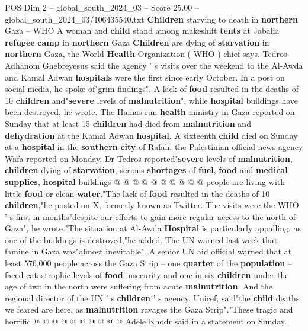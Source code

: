 \begin{textsample}{POS Dim 2 – global\_south\_2024\_03 – Score 25.00 – global\_south\_2024\_03/106435540.txt}  \label{ex:f2_pos_017}
\textbf{Children} starving to death in \textbf{northern} Gaza -- WHO A woman and \textbf{child} stand among makeshift \textbf{tents} at Jabalia \textbf{refugee} \textbf{camp} in \textbf{northern} Gaza \textbf{Children} are dying of \textbf{starvation} in \textbf{northern} Gaza, the World \textbf{Health} Organization ( WHO ) chief says.
Tedros Adhanom Ghebreyesus said the agency ' s visits over the weekend to the Al-Awda and Kamal Adwan \textbf{hospitals} were the first since early October.
In a post on social media, he spoke of"grim findings".
A lack of \textbf{food} resulted in the deaths of 10 \textbf{children} and"\textbf{severe} levels of \textbf{malnutrition}", while \textbf{hospital} buildings have been destroyed, he wrote.
The Hamas-run \textbf{health} ministry in Gaza reported on Sunday that at least 15 \textbf{children} had died from \textbf{malnutrition} and \textbf{dehydration} at the Kamal Adwan \textbf{hospital}.
A sixteenth \textbf{child} died on Sunday at a \textbf{hospital} in the \textbf{southern} \textbf{city} of Rafah, the Palestinian official news agency Wafa reported on Monday.
Dr Tedros reported"\textbf{severe} levels of \textbf{malnutrition}, \textbf{children} dying of \textbf{starvation}, serious \textbf{shortages} of \textbf{fuel}, \textbf{food} and \textbf{medical} \textbf{supplies}, \textbf{hospital} buildings @ @ @ @ @ @ @ @ @ @ people are living with little \textbf{food} or clean \textbf{water}."The lack of \textbf{food} resulted in the deaths of 10 \textbf{children},"he posted on X, formerly known as Twitter.
The visits were the WHO ' s first in months"despite our efforts to gain more regular access to the north of Gaza", he wrote."The situation at Al-Awda \textbf{Hospital} is particularly appalling, as one of the buildings is destroyed,"he added.
The UN warned last week that famine in Gaza was"almost inevitable".
A senior UN aid official warned that at least 576,000 people across the Gaza Strip -- one \textbf{quarter} of the \textbf{population} -- faced catastrophic levels of \textbf{food} insecurity and one in six \textbf{children} under the age of two in the north were suffering from acute \textbf{malnutrition}.
And the regional director of the UN ' s \textbf{children} ' s agency, Unicef, said"the \textbf{child} deaths we feared are here, as \textbf{malnutrition} ravages the Gaza Strip"."These tragic and horrific @ @ @ @ @ @ @ @ @ @ Adele Khodr said in a statement on Sunday.

\end{textsample}
